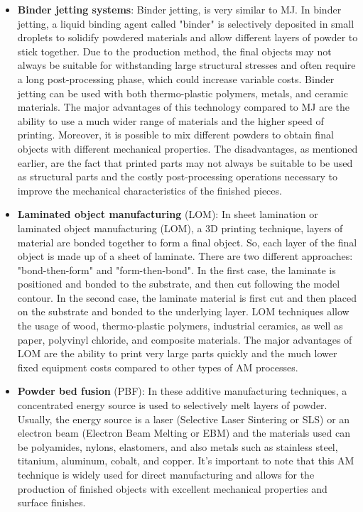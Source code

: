 \begin{itemize}
    \item \textbf{Binder jetting systems}: Binder jetting, is very similar to MJ. In binder jetting, a liquid binding agent called "binder" is selectively deposited in small droplets to solidify powdered materials and allow different layers of powder to stick together. Due to the production method, the final objects may not always be suitable for withstanding large structural stresses and often require a long post-processing phase, which could increase variable costs. Binder jetting can be used with both thermo-plastic polymers, metals, and ceramic materials. The major advantages of this technology compared to MJ are the ability to use a much wider range of materials and the higher speed of printing. Moreover, it is possible to mix different powders to obtain final objects with different mechanical properties. The disadvantages, as mentioned earlier, are the fact that printed parts may not always be suitable to be used as structural parts and the costly post-processing operations necessary to improve the mechanical characteristics of the finished pieces.
    \item \textbf{Laminated object manufacturing} (LOM): In sheet lamination or laminated object manufacturing (LOM), a 3D printing technique, layers of material are bonded together to form a final object. So, each layer of the final object is made up of a sheet of laminate. There are two different approaches: "bond-then-form" and "form-then-bond". In the first case, the laminate is positioned and bonded to the substrate, and then cut following the model contour. In the second case, the laminate material is first cut and then placed on the substrate and bonded to the underlying layer. LOM techniques allow the usage of wood, thermo-plastic polymers, industrial ceramics, as well as paper, polyvinyl chloride, and composite materials. The major advantages of LOM are the ability to print very large parts quickly and the much lower fixed equipment costs compared to other types of AM processes.
    \item \textbf{Powder bed fusion} (PBF):  In these additive manufacturing techniques, a concentrated energy source is used to selectively melt layers of powder. Usually, the energy source is a laser (Selective Laser Sintering or SLS) or an electron beam (Electron Beam Melting or EBM) and the materials used can be polyamides, nylons, elastomers, and also metals such as stainless steel, titanium, aluminum, cobalt, and copper. It's important to note that this AM technique is widely used for direct manufacturing and allows for the production of finished objects with excellent mechanical properties and surface finishes.

\end{itemize}
